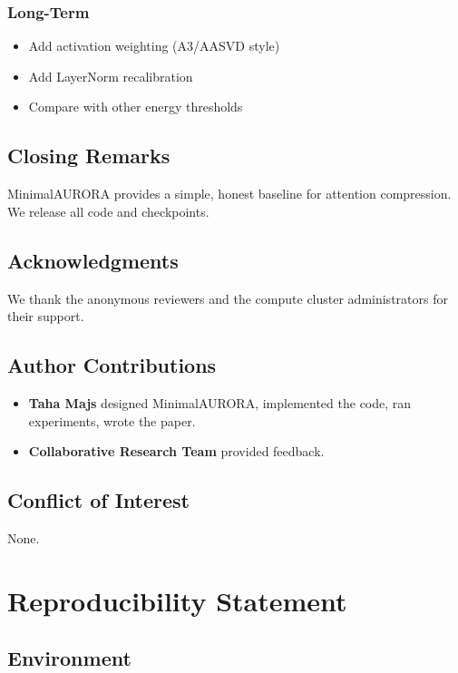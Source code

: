 \subsubsection{Long-Term}
\begin{itemize}
\item Add activation weighting (A3/AASVD style)
\item Add LayerNorm recalibration
\item Compare with other energy thresholds

\end{itemize}
\subsection{Closing Remarks}

MinimalAURORA provides a simple, honest baseline for attention 
compression. We release all code and checkpoints.

\subsection{Acknowledgments}

We thank the anonymous reviewers and the compute cluster administrators for their support.

\subsection{Author Contributions}

\begin{itemize}
\item \textbf{Taha Majs} designed MinimalAURORA, implemented the code, ran
  experiments, wrote the paper.
\item \textbf{Collaborative Research Team} provided feedback.

\end{itemize}
\subsection{Conflict of Interest}

None.



\section{Reproducibility Statement}

\subsection{Environment}

